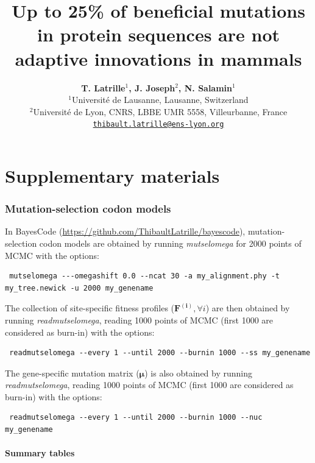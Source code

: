 \documentclass{article}
\title{Up to 25\% of beneficial mutations in protein sequences are not adaptive innovations in mammals}
\author{
    \large
    \textbf{T. {Latrille}$^{1}$, J. {Joseph}$^{2}$, N. {Salamin}$^{1}$}\\
    \normalsize
    $^{1}$Université de Lausanne, Lausanne, Switzerland\\
    $^{2}$Université de Lyon, CNRS, LBBE UMR 5558, Villeurbanne, France \\
    \texttt{\href{mailto:thibault.latrille@ens-lyon.org}{thibault.latrille@ens-lyon.org}} \\
}
\date{}
\newcommand{\UniDimArray}[1]{\bm{#1}}
\begin{document}
    \maketitle
    \part*{Supplementary materials}
    \tableofcontents
    \clearpage


    \section{Mutation-selection codon models}\label{sec:site-specific-mutation-selection-codon-models}
    In BayesCode (\url{https://github.com/ThibaultLatrille/bayescode}), mutation-selection codon models are obtained by running \textit{mutselomega} for 2000 points of MCMC with the options:
    \begin{scriptsize}
        \begin{verbatim}
 mutselomega ---omegashift 0.0 --ncat 30 -a my_alignment.phy -t my_tree.newick -u 2000 my_genename
        \end{verbatim}
    \end{scriptsize}
    The collection of site-specific fitness profiles ($\UniDimArray{F^{(i)}}, \forall i$) are then obtained by running \textit{readmutselomega}, reading 1000 points of MCMC (first 1000 are considered as burn-in) with the options:
    \begin{scriptsize}
        \begin{verbatim}
 readmutselomega --every 1 --until 2000 --burnin 1000 --ss my_genename
        \end{verbatim}
    \end{scriptsize}
    The gene-specific mutation matrix ($\UniDimArray{\mu}$) is also obtained by running \textit{readmutselomega}, reading 1000 points of MCMC (first 1000 are considered as burn-in) with the options:
    \begin{scriptsize}
        \begin{verbatim}
 readmutselomega --every 1 --until 2000 --burnin 1000 --nuc my_genename
        \end{verbatim}
    \end{scriptsize}

    \subsection{Summary tables}\label{subsec:summary-table-mutsel}
\end{document}
